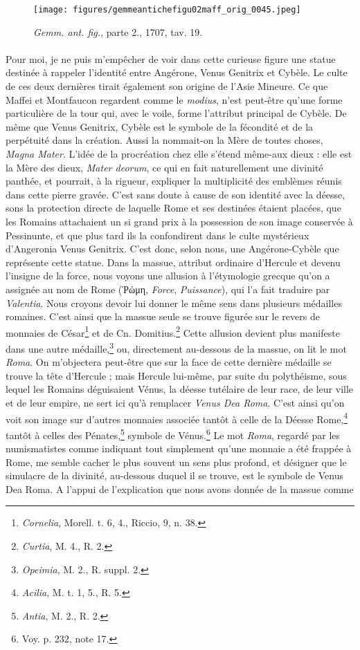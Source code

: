 \documentclass[a4paper, 11pt, oneside, polutonikogreek, french]{article}
\begin{document}
\begin{figure}[H]
\centering
\texttt{[image: figures/gemmeantichefigu02maff\_orig\_0045.jpeg]}
\caption{\emph{Gemm. ant. fig.}, parte 2., 1707, tav. 19.}
\end{figure}
\paragraph{}
Pour moi, je ne puis m'empêcher de voir dans cette curieuse figure une statue destinée à rappeler l'identité entre Angérone, Venus Genitrix et Cybèle. Le culte de ces deux dernières tirait également son origine de l'Asie Mineure. Ce que Maffei et Montfaucon regardent comme le \emph{modius}, n'est peut-être qu'une forme particulière de la tour qui, avec le voile, forme l'attribut principal de Cybèle. De même que Venus Genitrix, Cybèle est le symbole de la fécondité et de la perpétuité dans la création. Aussi la nommait-on la Mère de toutes choses, \emph{Magna Mater}. L'idée de la procréation chez elle s'étend même-aux dieux : elle est la Mère des dieux, \emph{Mater deorum}, ce qui en fait naturellement une divinité panthée, et pourrait, à la rigueur, expliquer la multiplicité des emblèmes réunis dans cette pierre gravée. C'est sans doute à cause de son identité avec la déesse, sons la protection directe de laquelle Rome et ses destinées étaient placées, que les Romains attachaient un si grand prix à la possession de son image conservée à Pessinunte, et que plus tard ils la confondirent dans le culte mystérieux d'Angeronia Venus Genitrix. C'est donc, selon nous, une Angérone-Cybèle que représente cette statue. Dans la massue, attribut ordinaire d'Hercule et devenu l'insigne de la force, nous voyons une allusion à l'étymologie grecque qu'on a assignée au nom de Rome (Ῥώμη, \emph{Force}, \emph{Puissance}), qui l'a fait traduire par \emph{Valentia}. Nous croyons devoir lui donner le même sens dans plusieurs médailles romaines. C'est ainsi que la massue seule se trouve figurée sur le revers de monnaies de César\footnote{\emph{Cornelia}, Morell. t. 6, 4., Riccio, 9, n. 38.} et de Cn. Domitius.\footnote{\emph{Curtia}, M. 4., R. 2.} Cette allusion devient plus manifeste dans une autre médaille,\footnote{\emph{Opeimia}, M. 2., R. suppl. 2.} ou, directement au-dessous de la massue, on lit le mot \emph{Roma}. On m'objectera peut-être que sur la face de cette dernière médaille se trouve la tête d'Hercule ; mais Hercule lui-même, par suite du polythéisme, sous lequel les Romains déguisaient Vénus, la déesse tutélaire de leur race, de leur ville et de leur empire, ne sert ici qu'à remplacer \emph{Venus Dea Roma}. C'est ainsi qu'on voit son image sur d'autres monnaies associée tantôt à celle de la Déesse Rome,\footnote{\emph{Acilia}, M. t. 1, 5., R. 5.} tantôt à celles des Pénates,\footnote{\emph{Antia}, M. 2., R. 2.} symbole de Vénus.\footnote{Voy. p. 232, note 17.} Le mot \emph{Roma}, regardé par les numismatistes comme indiquant tout simplement qu'une monnaie a été frappée à Rome, me semble cacher le plus souvent un sens plus profond, et désigner que le simulacre de la divinité, au-dessous duquel il se trouve, est le symbole de Venus Dea Roma. A l'appui de l'explication que nous avons donnée de la massue comme 
\end{document}
